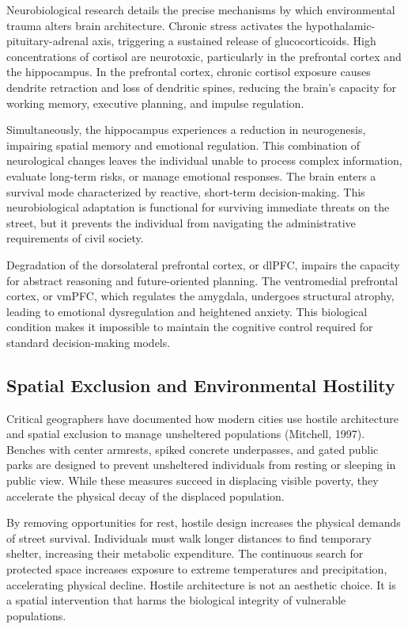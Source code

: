 \documentclass[12pt]{article}
\begin{document}
Neurobiological research details the precise mechanisms by which environmental trauma alters brain architecture. Chronic stress activates the hypothalamic-pituitary-adrenal axis, triggering a sustained release of glucocorticoids. High concentrations of cortisol are neurotoxic, particularly in the prefrontal cortex and the hippocampus. In the prefrontal cortex, chronic cortisol exposure causes dendrite retraction and loss of dendritic spines, reducing the brain's capacity for working memory, executive planning, and impulse regulation.

Simultaneously, the hippocampus experiences a reduction in neurogenesis, impairing spatial memory and emotional regulation. This combination of neurological changes leaves the individual unable to process complex information, evaluate long-term risks, or manage emotional responses. The brain enters a survival mode characterized by reactive, short-term decision-making. This neurobiological adaptation is functional for surviving immediate threats on the street, but it prevents the individual from navigating the administrative requirements of civil society.

Degradation of the dorsolateral prefrontal cortex, or dlPFC, impairs the capacity for abstract reasoning and future-oriented planning. The ventromedial prefrontal cortex, or vmPFC, which regulates the amygdala, undergoes structural atrophy, leading to emotional dysregulation and heightened anxiety. This biological condition makes it impossible to maintain the cognitive control required for standard decision-making models.

\subsection{Spatial Exclusion and Environmental Hostility}
Critical geographers have documented how modern cities use hostile architecture and spatial exclusion to manage unsheltered populations (Mitchell, 1997). Benches with center armrests, spiked concrete underpasses, and gated public parks are designed to prevent unsheltered individuals from resting or sleeping in public view. While these measures succeed in displacing visible poverty, they accelerate the physical decay of the displaced population.

By removing opportunities for rest, hostile design increases the physical demands of street survival. Individuals must walk longer distances to find temporary shelter, increasing their metabolic expenditure. The continuous search for protected space increases exposure to extreme temperatures and precipitation, accelerating physical decline. Hostile architecture is not an aesthetic choice. It is a spatial intervention that harms the biological integrity of vulnerable populations.
\end{document}
